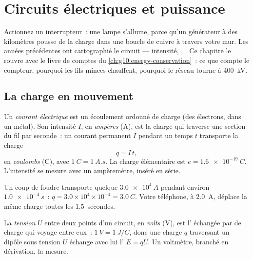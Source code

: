 \chapter{Circuits électriques et puissance}\label{ch:g11:circuits-and-power}

Actionnez un interrupteur~: une lampe s'allume, parce qu'un générateur
à des kilomètres pousse de la charge dans une boucle de cuivre à travers
votre mur. Les années précédentes ont cartographié le circuit ---
intensité, ,
. Ce chapitre le rouvre
avec le livre de comptes du \cref{ch:g10:energy-conservation}~: ce que
compte le compteur, pourquoi les fils
minces chauffent, pourquoi le réseau
tourne à \qty{400}{kV}.

\section{La charge en mouvement}

\begin{definition}\label{def:g11:circuits-and-power:current}
Un \emph{courant électrique} est un
écoulement ordonné de charge (des électrons, dans un métal). Son
intensité $I$, en \emph{ampères} (\unit{A}), est la charge
qui traverse une section du fil par seconde~: un courant permanent $I$
pendant un temps $t$ transporte la charge
\[ q = I\,t , \]
en \emph{coulombs} (\unit{C}), avec $\qty{1}{C} =
\qty{1}{A.s}$. La charge élémentaire est $e = \qty{1.6e-19}{C}$.
L'intensité se mesure avec un ampèremètre, inséré en série.
\end{definition}

\begin{example}\label{ex:g11:circuits-and-power:coulomb}
Un coup de foudre transporte quelque $\qty{3.0e4}{A}$ pendant environ
$\qty{1.0e-4}{s}$~: $q = 3.0\times10^{4} \times 10^{-4} = \qty{3.0}{C}$.
Votre téléphone, à \qty{2.0}{A}, déplace la même charge toutes les
$1.5$~secondes.
\end{example}

\begin{definition}\label{def:g11:circuits-and-power:voltage}
La \emph{tension} $U$ entre deux points d'un circuit, en
\emph{volts} (\unit{V}), est l'
échangée par  de charge qui voyage
entre eux~: $\qty{1}{V} = \qty{1}{J/C}$, donc une charge $q$ traversant
un dipôle sous tension $U$ échange avec lui l'
$E = qU$. Un voltmètre, branché en dérivation, la mesure.
\end{definition}

